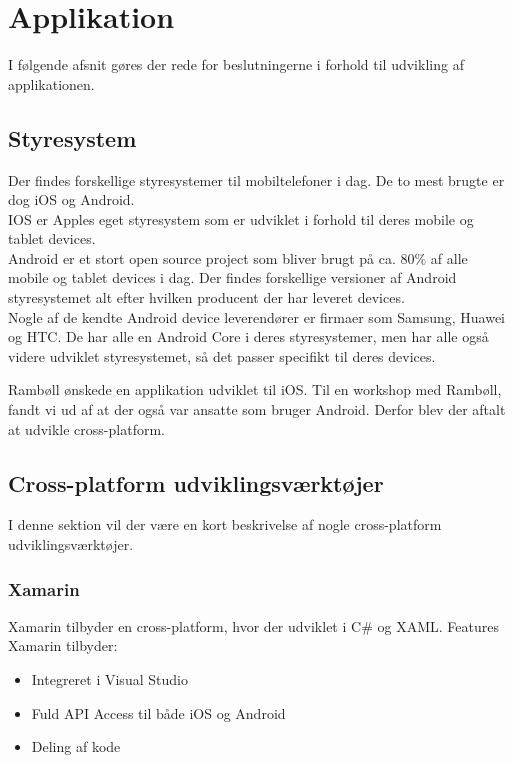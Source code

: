\section{Applikation}                                   
I følgende afsnit gøres der rede for beslutningerne i forhold til udvikling af applikationen.

\subsection{Styresystem}
Der findes forskellige styresystemer til mobiltelefoner i dag. De to mest brugte er dog iOS \cite{iOS} og Android. \cite{Android} \\
IOS er Apples eget styresystem som er udviklet i forhold til deres mobile og tablet devices. \\
Android er et stort open source project som bliver brugt på ca. 80\% af alle mobile og tablet devices i dag. Der findes forskellige versioner af Android styresystemet alt efter hvilken producent der har leveret devices. \\
Nogle af de kendte Android device leverendører er firmaer som Samsung, Huawei og HTC. De har alle en Android Core i deres styresystemer, men har alle også videre udviklet styresystemet, så det passer specifikt til deres devices.

Rambøll ønskede en applikation udviklet til iOS. Til en workshop med Rambøll, fandt vi ud af at der også var ansatte som bruger Android. Derfor blev der aftalt at udvikle cross-platform.

\subsection{Cross-platform udviklingsværktøjer}
I denne sektion vil der være en kort beskrivelse af nogle cross-platform udviklingsværktøjer.

\subsubsection{Xamarin}
Xamarin\cite{Xarmain} tilbyder en cross-platform, hvor der udviklet i C\#\cite{CSharp} og XAML\cite{XAML}.
Features Xamarin tilbyder:
\begin{itemize}[-]
	\item Integreret i Visual Studio
	\item Fuld API Access til både iOS og Android
	\item Deling af kode
\end{itemize}

